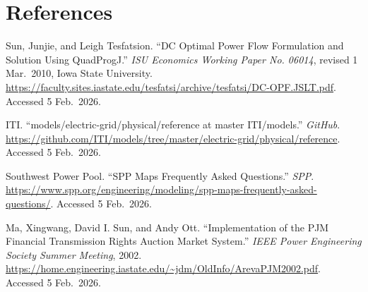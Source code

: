 \documentclass[11pt]{article}
\begin{document}
\newpage
\section{References}
\begin{sloppypar}
\noindent
Sun, Junjie, and Leigh Tesfatsion. ``DC Optimal Power Flow Formulation and Solution Using QuadProgJ.'' \textit{ISU Economics Working Paper No. 06014}, revised 1 Mar.\ 2010, Iowa State University. \url{https://faculty.sites.iastate.edu/tesfatsi/archive/tesfatsi/DC-OPF.JSLT.pdf}. Accessed 5 Feb.\ 2026.
\end{sloppypar}

\noindent
ITI. ``models/electric-grid/physical/reference at master \textperiodcentered{} ITI/models.'' \textit{GitHub}. \url{https://github.com/ITI/models/tree/master/electric-grid/physical/reference}. Accessed 5 Feb.\ 2026.

\noindent
Southwest Power Pool. ``SPP Maps Frequently Asked Questions.'' \textit{SPP}. \url{https://www.spp.org/engineering/modeling/spp-maps-frequently-asked-questions/}. Accessed 5 Feb.\ 2026.

\noindent
Ma, Xingwang, David I. Sun, and Andy Ott. ``Implementation of the PJM Financial Transmission Rights Auction Market System.'' \textit{IEEE Power Engineering Society Summer Meeting}, 2002. \url{https://home.engineering.iastate.edu/~jdm/OldInfo/ArevaPJM2002.pdf}. Accessed 5 Feb.\ 2026.
\end{document}
